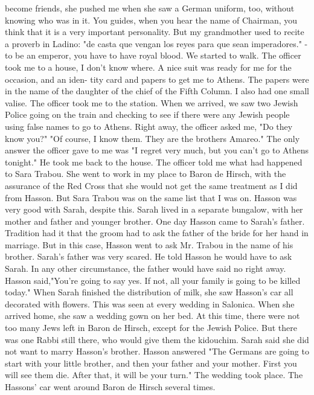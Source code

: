 become friends, she pushed me when she saw a German uniform, too, 
without knowing who was in it.
You guides, when you hear the name of Chairman, you think that it 
is a very important personality.
But my grandmother used to recite a 
proverb in Ladino: "de casta que vengan los reyes para que sean imperadores."
- to be an emperor, you have to have royal blood.
We started to walk.
The officer took me to a house, I don't know 
where.
A nice suit was ready for me for the occasion, and an iden-
tity card and papers to get me to Athens.
The papers were in the name 
of the daughter of the chief of the Fifth Column.
I also had one small 
valise.
The officer took me to the station.
When we arrived, we saw 
two Jewish Police going on the train and checking to see if there were 
any Jewish people using false names to go to Athens.
Right away, the 
officer asked me, "Do they know you?"
"Of course, I know them.
They 
are the brothers Amareo."
The only answer the officer gave to me was 
"I regret very much, but you can't go to Athens tonight."
He took me 
back to the house.
The officer told me what had happened to Sara Trabou.
She went to 
work in my place to Baron de Hirsch, with the assurance of the Red Cross 
that she would not get the same treatment as I did from Hasson.
But Sara 
Trabou was on the same list that I was on.
Hasson was very good with 
Sarah, despite this.
Sarah lived in a separate bungalow, with her mother and father and 
younger brother.
One day Hasson came to Sarah's father.
Tradition had 
it that the groom had to ask the father of the bride for her hand in 
marriage.
But in this case, Hasson went to ask Mr.
Trabou in the name 
of his brother.
Sarah's father was very scared.
He told Hasson he
would have to ask Sarah.
In any other circumstance, the father would 
have said no right away.
Hasson said,"You're going to say yes.
If not, 
all your family is going to be killed today."
When Sarah finished the distribution of milk, she saw Hasson's car 
all decorated with flowers.
This was seen at every wedding in Salonica.
When she arrived home, she saw a wedding gown on her bed.
At this time, 
there were not too many Jews left in Baron de Hirsch, except for the 
Jewish Police.
But there was one Rabbi still there, who would 
give them the kidouchim.
Sarah said she did not want to marry Hasson's 
brother.
Hasson answered "The Germans are going to start with your 
little brother, and then your father and your mother.
First you will 
see them die.
After that, it will be your turn."
The wedding took place.
The Hassons' car went around Baron de Hirsch several times.
